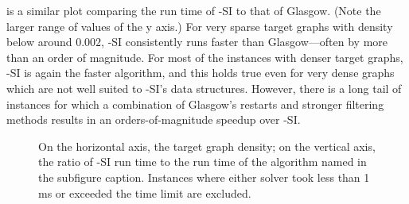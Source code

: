  is a similar plot comparing the run time of \McSplit-SI to that of Glasgow.
(Note the larger range of values of the y axis.)  For very sparse target graphs with density below around $0.002$,
\McSplit-SI consistently runs faster than Glasgow---often by more than an order of magnitude.  For most of the
instances with denser target graphs,
\McSplit-SI is again the faster algorithm, and this holds true even for very dense graphs which are not well suited
to \McSplit-SI's data structures.  However, there is a long tail of instances
for which a combination of Glasgow's restarts and stronger filtering methods results in
an orders-of-magnitude speedup over \McSplit-SI.

\begin{figure}[htb]
    \centering
    \caption{On the horizontal axis, the target graph density; on the vertical axis, the ratio of \McSplit-SI run time to
            the run time of the algorithm named in the subfigure caption.
            Instances where either solver took less than 1 ms or exceeded the time limit are excluded.}
    \label{figure:density-runtime-ratio}
\end{figure}

